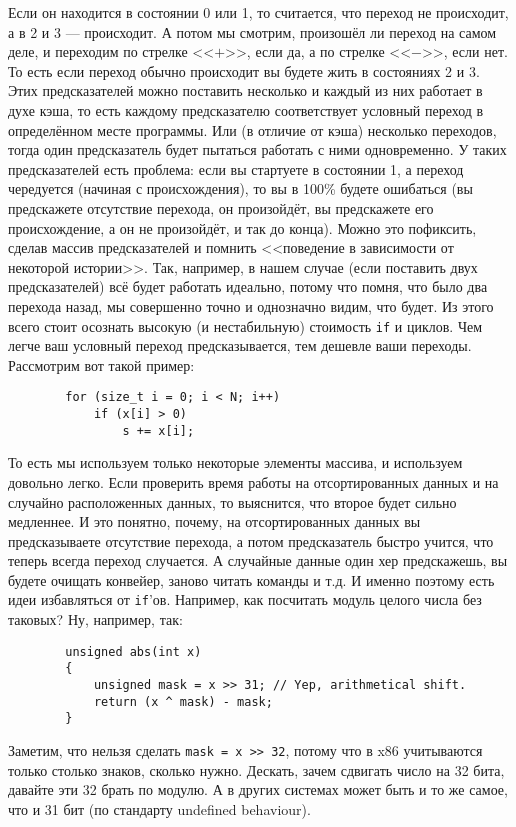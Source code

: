 \documentclass{article}
\begin{document}
    Если он находится в состоянии 0 или 1, то считается, что переход не происходит, а в 2 и 3 --- происходит. А потом мы смотрим, произошёл ли переход на самом деле, и переходим по стрелке <<$+$>>, если да, а по стрелке <<$-$>>, если нет. То есть если переход обычно происходит вы будете жить в состояниях 2 и 3. Этих предсказателей можно поставить несколько и каждый из них работает в духе кэша, то есть каждому предсказателю соответствует условный переход в определённом месте программы. Или (в отличие от кэша) несколько переходов, тогда один предсказатель будет пытаться работать с ними одновременно. У таких предсказателей есть проблема: если вы стартуете в состоянии 1, а переход чередуется (начиная с происхождения), то вы в 100\% будете ошибаться (вы предскажете отсутствие перехода, он произойдёт, вы предскажете его происхождение, а он не произойдёт, и так до конца). Можно это пофиксить, сделав массив предсказателей и помнить <<поведение в зависимости от некоторой истории>>. Так, например, в нашем случае (если поставить двух предсказателей) всё будет работать идеально, потому что помня, что было два перехода назад, мы совершенно точно и однозначно видим, что будет.
    Из этого всего стоит осознать высокую (и нестабильную) стоимость \texttt{if} и циклов. Чем легче ваш условный переход предсказывается, тем дешевле ваши переходы. Рассмотрим вот такой пример:
    \begin{verbatim}
        for (size_t i = 0; i < N; i++)
            if (x[i] > 0)
                s += x[i];
    \end{verbatim}
    То есть мы используем только некоторые элементы массива, и используем довольно легко. Если проверить время работы на отсортированных данных и на случайно расположенных данных, то выяснится, что второе будет сильно медленнее. И это понятно, почему, на отсортированных данных вы предсказываете отсутствие перехода, а потом предсказатель быстро учится, что теперь всегда переход случается. А случайные данные один хер предскажешь, вы будете очищать конвейер, заново читать команды и т.д. И именно поэтому есть идеи избавляться от \texttt{if}'ов. Например, как посчитать модуль целого числа без таковых? Ну, например, так:
    \begin{verbatim}
        unsigned abs(int x)
        {
            unsigned mask = x >> 31; // Yep, arithmetical shift.
            return (x ^ mask) - mask;
        }
    \end{verbatim}
    Заметим, что нельзя сделать \texttt{mask = x >> 32}, потому что в x86 учитываются только столько знаков, сколько нужно. Дескать, зачем сдвигать число на 32 бита, давайте эти 32 брать по модулю. А в других системах может быть и то же самое, что и 31 бит (по стандарту undefined behaviour).\\
\end{document}
